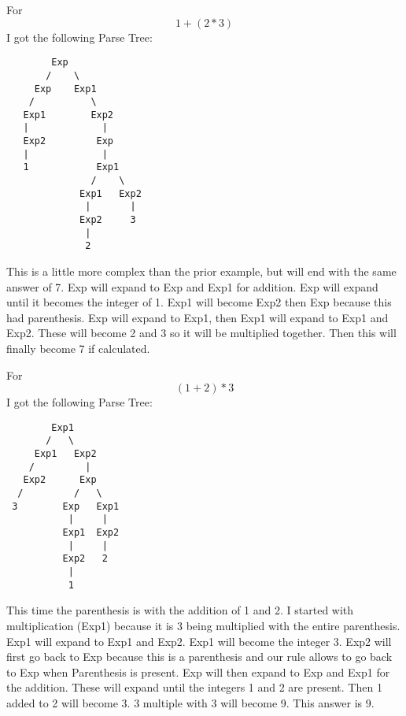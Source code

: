 \documentclass{article}
\theoremstyle{theorem}
\theoremstyle{definition}
\theoremstyle{remark}
\begin{document}
\noindent\newline\newline For $$1+(2*3)$$ I got the following Parse Tree:
\begin{verbatim}
        Exp
       /    \
     Exp    Exp1
    /          \
   Exp1        Exp2
   |             |
   Exp2         Exp
   |             |
   1            Exp1
               /    \
             Exp1   Exp2
              |       |
             Exp2     3
              |
              2
\end{verbatim}
\noindent\newline This is a little more complex than the prior example, but will end with the same answer of 7. Exp will expand to Exp and Exp1 for addition. Exp will expand until it becomes the integer of 1. Exp1 will become Exp2 then Exp because this had parenthesis. Exp will expand to Exp1, then Exp1 will expand to Exp1 and Exp2. These will become 2 and 3 so it will be multiplied together. Then this will finally become 7 if calculated.


\noindent\newline\newline For $$(1+2)*3$$ I got the following Parse Tree:
\begin{verbatim}
        Exp1
       /   \
     Exp1   Exp2
    /         |
   Exp2      Exp
  /         /   \
 3        Exp   Exp1
           |     |
          Exp1  Exp2
           |     |
          Exp2   2
           |
           1
\end{verbatim}
\noindent\newline This time the parenthesis is with the addition of 1 and 2. I started with multiplication (Exp1) because it is 3 being multiplied with the entire parenthesis. Exp1 will expand to Exp1 and Exp2. Exp1 will become the integer 3. Exp2 will first go back to Exp because this is a parenthesis and our rule allows to go back to Exp when Parenthesis is present. Exp will then expand to Exp and Exp1 for the addition. These will expand until the integers 1 and 2 are present. Then 1 added to 2 will become 3. 3 multiple with 3 will become 9. This answer is 9.
\end{document}
